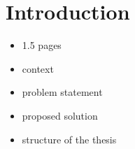 \section{Introduction}
\label{sec:introduction}

\begin{itemize} 
    \item 1.5 pages
    \item context
    \item problem statement
    \item proposed solution
    \item structure of the thesis 
\end{itemize}